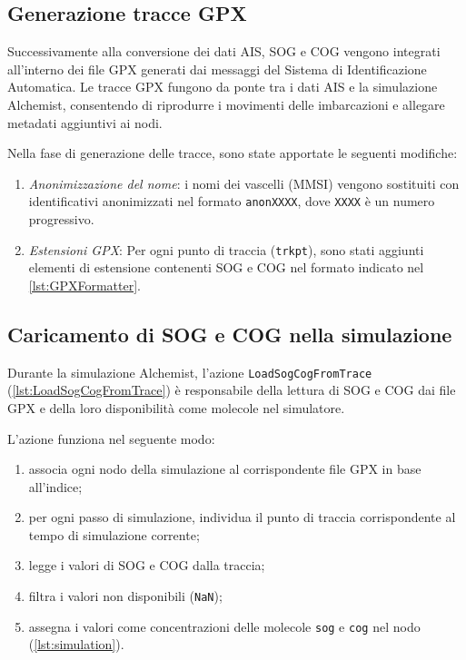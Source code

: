

\newpage

\subsection{Generazione tracce GPX}
\label{sec:generazione_tracce_GPX}

Successivamente alla conversione dei dati \ac{AIS}, \ac{SOG} e \ac{COG} vengono integrati all'interno dei file \ac{GPX} generati dai messaggi del Sistema di Identificazione Automatica. Le tracce \ac{GPX} fungono da ponte tra i dati AIS e la simulazione Alchemist, consentendo di riprodurre i movimenti delle imbarcazioni e allegare metadati aggiuntivi ai nodi.

Nella fase di generazione delle tracce, sono state apportate le seguenti modifiche:

\begin{enumerate}
    \item \emph{Anonimizzazione del nome}: i nomi dei vascelli (\ac{MMSI}) vengono sostituiti con identificativi anonimizzati nel formato \texttt{anonXXXX}, dove \texttt{XXXX} è un numero progressivo.
    \item \emph{Estensioni \ac{GPX}}: Per ogni punto di traccia (\texttt{trkpt}), sono stati aggiunti elementi di estensione contenenti \ac{SOG} e \ac{COG} nel formato indicato nel \cref{lst:GPXFormatter}.
\end{enumerate}



\subsection{Caricamento di SOG e COG nella simulazione}
\label{sec:caricamento_dati_simulazione}

Durante la simulazione Alchemist, l'azione \texttt{LoadSogCogFromTrace} (\cref{lst:LoadSogCogFromTrace}) è responsabile della lettura di \ac{SOG} e \ac{COG} dai file \ac{GPX} e della loro disponibilità come molecole nel simulatore.

L'azione funziona nel seguente modo:
\begin{enumerate}
    \item associa ogni nodo della simulazione al corrispondente file \ac{GPX} in base all'indice;
    \item per ogni passo di simulazione, individua il punto di traccia corrispondente al tempo di simulazione corrente;
    \item legge i valori di \ac{SOG} e \ac{COG} dalla traccia;
    \item filtra i valori non disponibili (\texttt{NaN});
    \item assegna i valori come concentrazioni delle molecole \texttt{sog} e \texttt{cog} nel nodo (\cref{lst:simulation}).
\end{enumerate}

